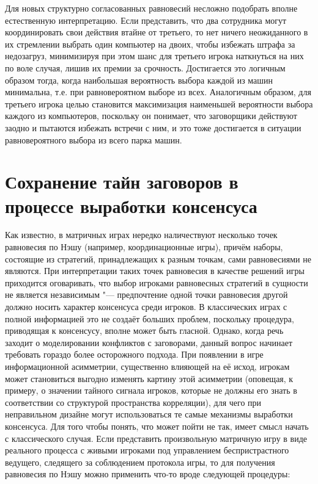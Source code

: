 Для новых структурно согласованных равновесий несложно подобрать вполне естественную интерпретацию. Если представить, что два сотрудника могут координировать свои действия втайне от третьего, то нет ничего неожиданного в их стремлении выбрать один компьютер на двоих, чтобы избежать штрафа за недозагруз, минимизируя при этом шанс для третьего игрока наткнуться на них по воле случая, лишив их премии за срочность. Достигается это логичным образом тогда, когда наибольшая вероятность выбора каждой из машин минимальна, т.е. при равновероятном выборе из всех. Аналогичным образом, для третьего игрока целью становится максимизация наименьшей вероятности выбора каждого из компьютеров, поскольку он понимает, что заговорщики действуют заодно и пытаются избежать встречи с ним, и это тоже достигается в ситуации равновероятного выбора из всего парка машин.

\section{Сохранение тайн заговоров в процессе выработки консенсуса}\label{sec:ch2/sec6}

Как известно, в матричных играх нередко наличествуют несколько точек равновесия по Нэшу (например, координационные игры), причём наборы, состоящие из стратегий, принадлежащих к разным точкам, сами равновесиями не являются. При интерпретации таких точек равновесия в качестве решений игры приходится оговаривать, что выбор игроками равновесных стратегий в сущности не является независимым "--- предпочтение одной точки равновесия другой должно носить характер консенсуса среди игроков. В классических играх с полной информацией это не создаёт больших проблем, поскольку процедура, приводящая к консенсусу, вполне может быть гласной. Однако, когда речь заходит о моделировании конфликтов с заговорами, данный вопрос начинает требовать гораздо более осторожного подхода. При появлении в игре информационной асимметрии, существенно влияющей на её исход, игрокам может становиться выгодно изменять картину этой асимметрии (оповещая, к примеру, о значении тайного сигнала игроков, которые не должны его знать в соответствии со структурой пространства корреляции), для чего при неправильном дизайне могут использоваться те самые механизмы выработки консенсуса. Для того чтобы понять, что может пойти не так, имеет смысл начать с классического случая. Если представить произвольную матричную игру в виде реального процесса с живыми игроками под управлением беспристрастного ведущего, следящего за соблюдением протокола игры, то для получения равновесия по Нэшу можно применить что-то вроде следующей процедуры:

